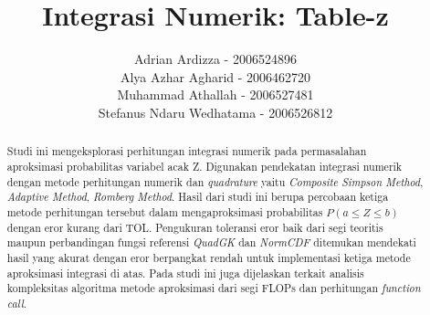 \documentclass[journal,12pt,onecolumn,a4paper]{IEEEtran}
\begin{document}
\begin{titlepage}
	\title{Integrasi Numerik: Table-z}



	\author{Adrian Ardizza - 2006524896\\
		Alya Azhar Agharid - 2006462720\\
		Muhammad Athallah - 2006527481\\
		Stefanus Ndaru Wedhatama - 2006526812
	}

	\maketitle
	\begin{abstract}
		Studi ini mengeksplorasi perhitungan integrasi numerik pada permasalahan aproksimasi probabilitas variabel acak Z. Digunakan pendekatan integrasi numerik dengan metode perhitungan numerik dan \emph{quadrature} yaitu \emph{Composite Simpson Method}, \emph{Adaptive Method}, \emph{Romberg Method}. Hasil dari studi ini berupa percobaan ketiga metode perhitungan tersebut dalam mengaproksimasi probabilitas \(P(a \le Z \le b)\) dengan eror kurang dari TOL. Pengukuran toleransi eror baik dari segi teoritis maupun perbandingan fungsi referensi \emph{QuadGK} dan \emph{NormCDF} ditemukan mendekati hasil yang akurat dengan eror berpangkat rendah untuk implementasi ketiga metode aproksimasi integrasi di atas. Pada studi ini juga dijelaskan terkait analisis kompleksitas algoritma metode aproksimasi dari segi FLOPs dan perhitungan \emph{function call}.
	\end{abstract}
	\tableofcontents
	\listoffigures
	\listoftables
\end{titlepage}

\IEEEpeerreviewmaketitle
\end{document}
